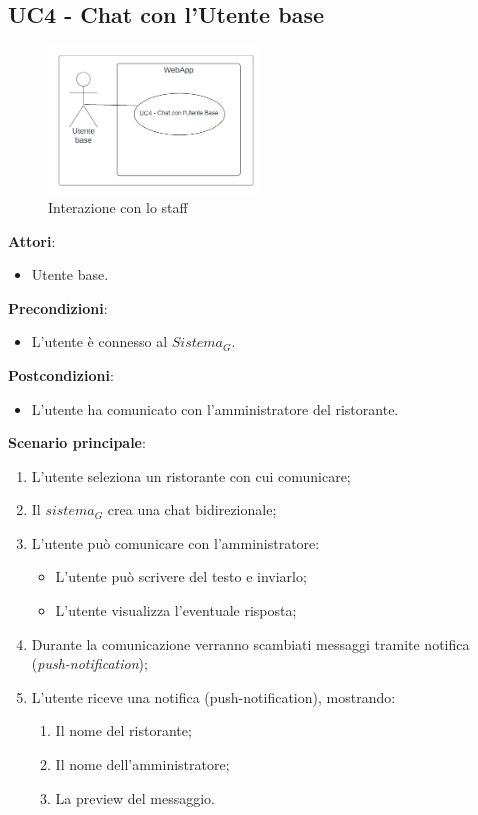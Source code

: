 \subsection{UC4 - Chat con l'Utente base}\label{usecase:4}
\begin{figure}[H]
  \centering
  \includegraphics[width=0.5\textwidth]{ucd/UCD4.png}
  \caption{Interazione con lo staff}
\end{figure}
\textbf{Attori}:
\begin{itemize}
    \item Utente base.
\end{itemize}
\textbf{Precondizioni}:
\begin{itemize}
    \item L'utente è connesso al $\textit{Sistema}_G$.
\end{itemize}
\textbf{Postcondizioni}:
\begin{itemize}
    \item L'utente ha comunicato con l'amministratore del ristorante.
\end{itemize}
\textbf{Scenario principale}:
\begin{enumerate}
    \item L'utente seleziona un ristorante con cui comunicare;
    \item Il $\textit{sistema}_G$ crea una chat bidirezionale;
    \item L'utente può comunicare con l'amministratore:
    \begin{itemize}
        \item L'utente può scrivere del testo e inviarlo;
        \item L'utente visualizza l'eventuale risposta;
    \end{itemize}
    \item Durante la comunicazione verranno scambiati messaggi tramite notifica (\textit{push-notification});
    \item L'utente riceve una notifica (push-notification), mostrando:
    \begin{enumerate}
        \item Il nome del ristorante;
        \item Il nome dell'amministratore;
        \item La preview del messaggio.
    \end{enumerate}
\end{enumerate}
